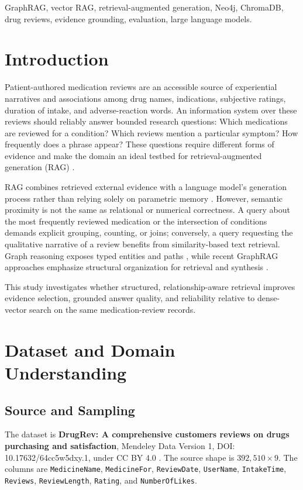 \documentclass[conference]{IEEEtran}
\begin{document}
\begin{IEEEkeywords}
GraphRAG, vector RAG, retrieval-augmented generation, Neo4j, ChromaDB, drug reviews, evidence grounding, evaluation, large language models.
\end{IEEEkeywords}

\section{Introduction}
Patient-authored medication reviews are an accessible source of experiential narratives and associations among drug names, indications, subjective ratings, duration of intake, and adverse-reaction words. An information system over these reviews should reliably answer bounded research questions: Which medications are reviewed for a condition? Which reviews mention a particular symptom? How frequently does a phrase appear? These questions require different forms of evidence and make the domain an ideal testbed for retrieval-augmented generation (RAG) \cite{lewis2020rag}.

RAG combines retrieved external evidence with a language model's generation process rather than relying solely on parametric memory \cite{guu2020realm, karpukhin2020dpr}. However, semantic proximity is not the same as relational or numerical correctness. A query about the most frequently reviewed medication or the intersection of conditions demands explicit grouping, counting, or joins; conversely, a query requesting the qualitative narrative of a review benefits from similarity-based text retrieval. Graph reasoning exposes typed entities and paths \cite{yasunaga2021qagnn}, while recent GraphRAG approaches emphasize structural organization for retrieval and synthesis \cite{edge2024graphrag}.

This study investigates whether structured, relationship-aware retrieval improves evidence selection, grounded answer quality, and reliability relative to dense-vector search on the same medication-review records.

\section{Dataset and Domain Understanding}
\subsection{Source and Sampling}
The dataset is \textbf{DrugRev: A comprehensive customers reviews on drugs purchasing and satisfaction}, Mendeley Data Version 1, DOI: 10.17632/64cc5w5dxy.1, under CC BY 4.0 \cite{rizwan2023drugrev}. The source shape is $392,510 \times 9$. The columns are \texttt{MedicineName}, \texttt{MedicineFor}, \texttt{ReviewDate}, \texttt{UserName}, \texttt{IntakeTime}, \texttt{Reviews}, \texttt{ReviewLength}, \texttt{Rating}, and \texttt{NumberOfLikes}.
\end{document}
